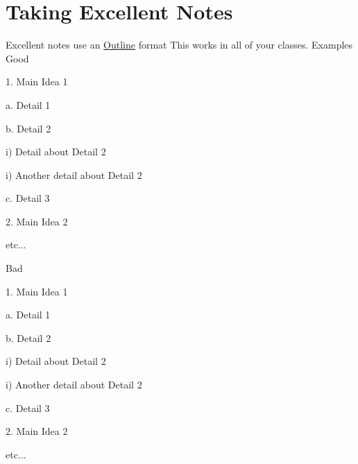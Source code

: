\documentclass[../main.tex]{subfiles}
\begin{document}
\chapter{Taking Excellent Notes}

\begin{outline}[enumerate]

\1 Excellent notes use an \underline{Outline} format
	\2	\color{dracRed}{This is required for my class to get your points for notes!}
\1 This works in all of your classes.
\1 Examples
	\2 Good



	1. Main Idea 1

	\quad a. Detail 1

	\quad b. Detail 2


	\quad \quad i) Detail about Detail 2

	\quad \quad i) Another detail about Detail 2

	\quad c. Detail 3

	2. Main Idea 2

	etc...

	\2 Bad

	1. Main Idea 1

	a. Detail 1

	b. Detail 2

	i) Detail about Detail 2

	i) Another detail about Detail 2

	c. Detail 3

	2. Main Idea 2

	etc...



\end{outline}
\end{document}

